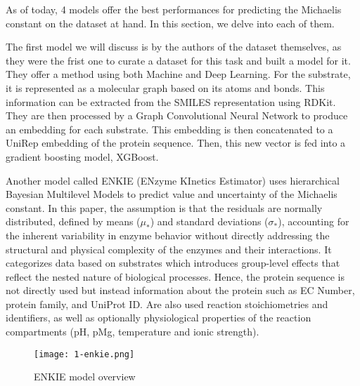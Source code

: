 As of today, 4 models offer the best performances for predicting the Michaelis constant on the dataset
at hand. In this section, we delve into each of them.

The first model we will discuss is by the authors of the dataset themselves, \citeauthor{km1} as they were
the frist one to curate a dataset for this task and built a model for it. They offer a method using both
Machine and Deep Learning. For the substrate, it is represented as a molecular graph based on its atoms and
bonds. This information can be extracted from the SMILES representation using RDKit. \cite{rdkit} They are
then processed by a Graph Convolutional Neural Network to produce an embedding for each substrate. This 
embedding is then concatenated to a UniRep embedding of the protein sequence. \cite{unirep} 
Then, this new vector is fed into a gradient boosting model, XGBoost. \cite{xgboost}

Another model called ENKIE (ENzyme KInetics Estimator) uses hierarchical Bayesian Multilevel
Models to predict value and uncertainty of the Michaelis constant. In this paper, the assumption is that
the residuals are normally distributed, defined by means ($\mu_*$) and standard deviations ($\sigma_*$), 
accounting for the inherent variability in enzyme behavior without directly addressing 
the structural and physical complexity of the enzymes and their interactions. It categorizes data based on
substrates which introduces group-level effects that reflect the nested nature of 
biological processes. Hence, the protein sequence is not directly used but instead information about the
protein such as EC Number, protein family, and UniProt ID. Are also used reaction stoichiometries and
identifiers, as well as optionally physiological properties of the reaction compartments (pH, pMg, 
temperature and ionic strength).

\begin{figure}
  \centering
  \texttt{[image: 1-enkie.png]}
  \caption{ENKIE model overview}
  \label{fig:enkie}
\end{figure}


